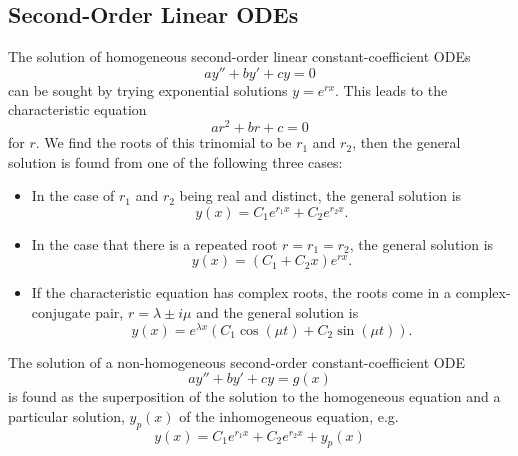 \subsection{Second-Order Linear ODEs}\label{sec:secondorderconst}

The solution of homogeneous second-order linear constant-coefficient ODEs
\begin{equation}\label{eq:revisionhom}
	ay'' + by' + cy = 0
\end{equation}
can be sought by trying exponential solutions $y = e^{rx}$. This leads to the characteristic equation
\[
ar^2 + br + c = 0
\]
for $r$. We find the roots of this trinomial to be $r_1$ and $r_2$, then the general solution is found from one of the following three cases:
\begin{itemize}
	\item In the case of $r_1$ and $r_2$ being real and distinct, the general solution is
	\[
	y(x) = C_1e^{r_1x} + C_2e^{r_2x}.
	\]
	\item In the case that there is a repeated root $r=r_1=r_2$, the general solution is
	\[
	y(x) = (C_1 + C_2x)e^{rx}.
	\]
	\item If the characteristic equation has complex roots, the roots come in a complex-conjugate pair, $r = \lambda \pm i\mu$ and the general solution is
	\[
	y(x) = e^{\lambda x}(C_1 \cos(\mu t) + C_2 \sin(\mu t)).
	\]
\end{itemize}

The solution of a non-homogeneous second-order constant-coefficient ODE
\begin{equation}\label{eq:revisionnonhom}
	ay'' + by' + cy = g(x)
\end{equation}
is found as the superposition of the solution to the homogeneous equation and a particular solution, $y_p(x)$ of the inhomogeneous equation, e.g.
\[
y(x) = C_1e^{r_1x} + C_2e^{r_2x} + y_p(x)
\]

